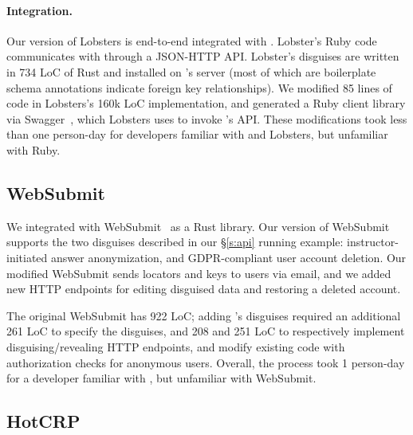 \paragraph{Integration.}
%
Our version of Lobsters is end-to-end integrated with \sys.
%
Lobster's Ruby code communicates with \sys through a JSON-HTTP API.
Lobster's disguises are written in 734 LoC of Rust and installed on \sys's server (most of which are
boilerplate schema annotations indicate \eg foreign key relationships).
%
We modified 85 lines of code in Lobsters's 160k LoC implementation, and generated a
Ruby client library via Swagger~\cite{swagger}, which Lobsters uses to invoke \sys's
API.
%
These modifications took less than one person-day for developers familiar with
\sys and Lobsters, but unfamiliar with Ruby.
%

\subsection{WebSubmit}
\label{s:case-websubmit}

%
We integrated \sys with WebSubmit~\cite{websubmit-rs-anon} as a Rust library.
%
Our version of WebSubmit supports the two disguises described in our \S\ref{s:api}
running example: instructor-initiated answer anonymization, and GDPR-compliant
user account deletion.
%
Our modified WebSubmit sends locators and keys to users via email, and we added
new HTTP endpoints for editing disguised data and restoring a deleted account.
%

%
The original WebSubmit has 922 LoC; adding \sys's disguises required an additional 261 LoC
to specify the disguises, and 208 and 251 LoC to respectively implement disguising/revealing HTTP
endpoints, and modify existing code with \eg authorization checks for anonymous users.
Overall, the process took 1 person-day for a developer familiar with \sys, but
unfamiliar with WebSubmit.
%

\subsection{HotCRP}
\label{s:case-hotcrp}

